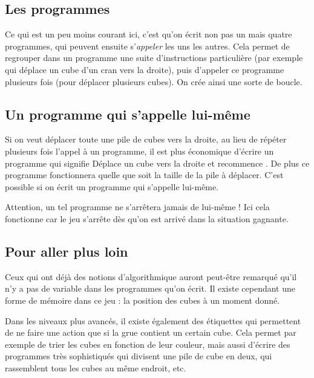 \documentclass[a4paper,11pt]{article}
\begin{document}
\subsection*{Les programmes}

Ce qui est un peu moins courant ici, c'est qu'on écrit non pas un mais
quatre programmes, qui peuvent ensuite s'\emph{appeler} les uns les
autres. Cela permet de regrouper dans un programme une suite
d'instructions particulière (par exemple qui déplace un cube d'un cran
vers la droite), puis d'appeler ce programme plusieurs fois (pour
déplacer plusieurs cubes). On crée ainsi une sorte de boucle.


\subsection*{Un programme qui s'appelle lui-même}

Si on veut déplacer toute une pile de cubes vers la droite, au lieu de
r\'ep\'eter plusieurs fois l'appel à un programme, il est plus
\'economique d'\'ecrire un programme qui signifie
\og Déplace un cube vers la droite et recommence \fg{}. De plus ce
programme fonctionnera quelle que soit la taille de la pile à
déplacer. C'est possible si on écrit un programme qui s'appelle lui-m\^eme.

Attention, un tel programme ne s'arrêtera jamais de lui-même ! Ici
cela fonctionne car le jeu s'arrête dès qu'on est arrivé dans la
situation gagnante.

\subsection*{Pour aller plus loin}

Ceux qui ont déjà des notions d'algorithmique auront peut-être
remarqué qu'il n'y a pas de variable dans les programmes qu'on
écrit. Il existe cependant une forme de \og mémoire \fg{} dans ce jeu
: la position des cubes à un moment donné.


Dans les niveaux plus avancés, il existe également des \'etiquettes
qui permettent de ne faire une action que si la grue contient un
certain cube. Cela permet par exemple de trier les cubes en fonction
de leur couleur, mais aussi d'écrire des programmes très sophistiqués
qui divisent une pile de cube en deux, qui rassemblent tous les cubes
au même endroit, etc.
\end{document}
